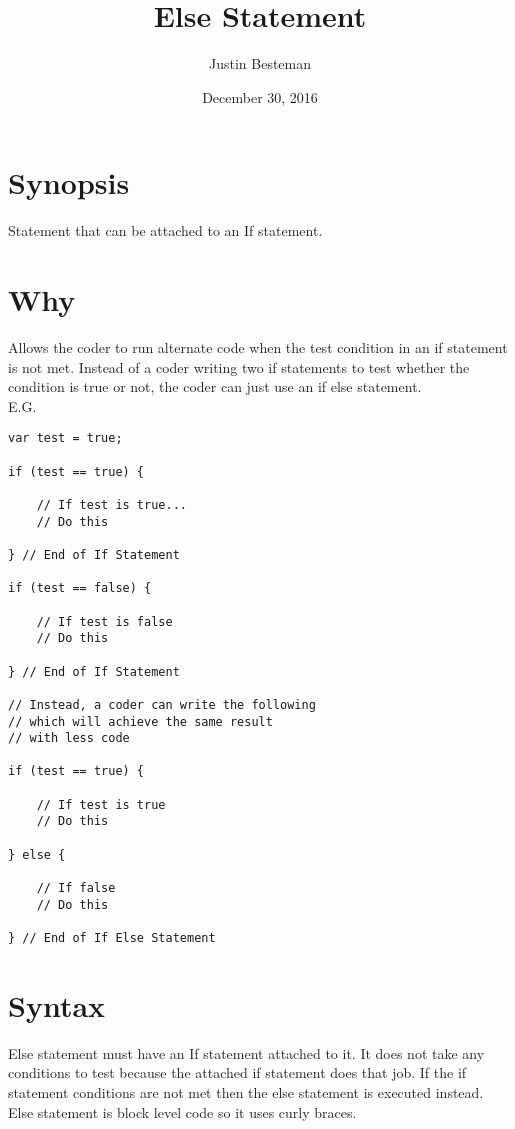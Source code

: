 \documentclass[12pt, letterpaper]{article}
\title{Else Statement}
\author{Justin Besteman}
\date{December 30, 2016}
\begin{document}
\maketitle


\section*{Synopsis}

Statement that can be attached to an If statement. 


\section*{Why}

Allows the coder to run alternate code when the test condition in an if statement is not met. Instead of a coder writing two if statements to test whether the condition is true or not, the coder can just use an if else statement. \\
E.G. \\
\begin{lstlisting}
var test = true;

if (test == true) {

	// If test is true...
	// Do this

} // End of If Statement

if (test == false) {

	// If test is false
	// Do this

} // End of If Statement

// Instead, a coder can write the following
// which will achieve the same result 
// with less code

if (test == true) {

	// If test is true
	// Do this

} else {

	// If false
	// Do this

} // End of If Else Statement
\end{lstlisting}

\section*{Syntax}

Else statement must have an If statement attached to it. It does not take any conditions to test because the attached if statement does that job. If the if statement conditions are not met then the else statement is executed instead. Else statement is block level code so it uses curly braces.
\end{document}
